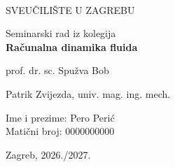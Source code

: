 \documentclass[a4paper,12pt]{article}
\begin{document}

\begin{titlepage}
\begin{center}

{\fontsize{20}{28}\selectfont {}}\\

\vspace*{0.5cm}
{\fontsize{18}{22}\selectfont SVEUČILIŠTE U ZAGREBU}

\vspace*{5cm}

{\fontsize{22}{24}\selectfont Seminarski rad iz kolegija}\\
\vspace*{1cm}
{\fontsize{24}{24}\selectfont \textbf{Računalna dinamika fluida}}

\vspace{1cm}

{\fontsize{18}{18}\selectfont prof. dr. sc. Spužva Bob}

\vspace{0.1cm}

{\fontsize{18}{18}\selectfont Patrik Zvijezda, univ. mag. ing. mech.}

\vfill

\begin{flushleft}
{\fontsize{14}{18}\selectfont Ime i prezime: Pero Perić}\\
{\fontsize{12}{18}\selectfont Matični broj: 0000000000}
\end{flushleft}


\vspace{1.5cm}

\begin{flushright}
{\fontsize{14}{18}\selectfont Zagreb, 2026./2027.}
\end{flushright}



\end{center}
\end{titlepage}


\newpage
{}

\tableofcontents

\newpage
\listoffigures
{}
\end{document}
